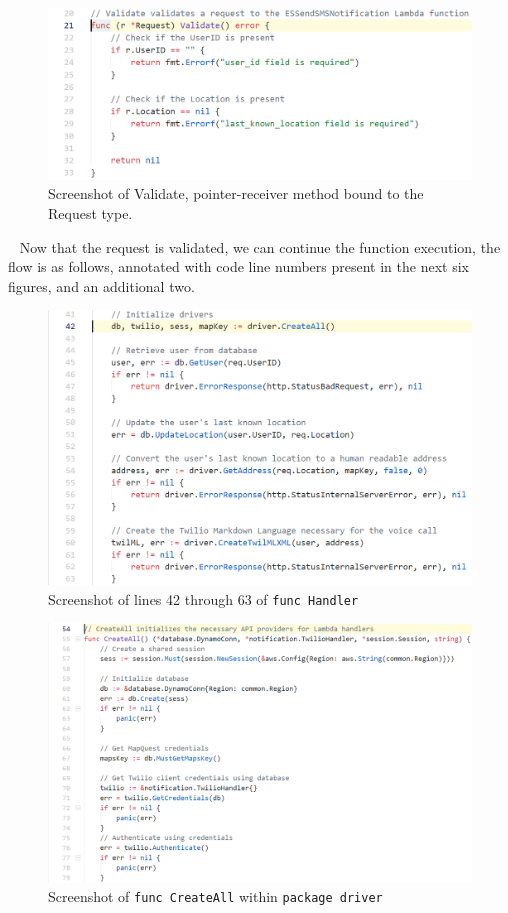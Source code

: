 \documentclass[10pt, a4paper]{article}
\begin{document}
\begin{figure}[H]
  \includegraphics[scale=.6]{code-screenshots/nine.png}
  \caption{Screenshot of Validate, pointer-receiver method bound to the Request type.}
\end{figure}

\par ~ Now that the request is validated, we can continue the function execution, the flow is as follows, annotated with code line numbers present in the next six figures, and an additional two.
\begin{figure}[H]
  \includegraphics[scale=.6]{code-screenshots/handler-42-63.png}
  \caption{Screenshot of lines 42 through 63 of \texttt{func Handler}}\label{fig:hm}
\end{figure}

\begin{figure}[H]
  \includegraphics[scale=.6]{code-screenshots/create-all.png}
  \caption{Screenshot of \texttt{func CreateAll} within \texttt{package driver}}\label{fig:ca}
\end{figure}
\end{document}
